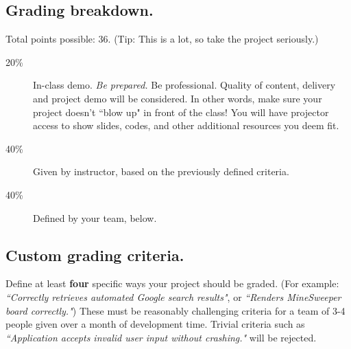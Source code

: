 \documentclass[12pt]{article}
\begin{document}
\subsection{Grading breakdown.}

Total points possible: 36. (Tip: This is a lot, so take the project seriously.)

\begin{description}
\item[20\%] In-class demo. {\it Be prepared.} Be professional. Quality of content, delivery and project demo will be considered. In other words, make sure your project doesn't ``blow up" in front of the class! You will have projector access to show slides, codes, and other additional resources you deem fit. 
\item[40\%] Given by instructor, based on the previously defined criteria.
\item[40\%] Defined by your team, below.
\end{description}

\subsection{Custom grading criteria.}

Define at least {\bf four} specific ways your project should be graded. (For example: {\it ``Correctly retrieves automated Google search results"}, or {\it ``Renders MineSweeper board correctly."}) These must be reasonably challenging criteria for a team of 3-4 people given over a month of development time. Trivial criteria such as {\it ``Application accepts invalid user input without crashing."} will be rejected.

\underline{\phantom{\hspace{5in}}}

\underline{\phantom{\hspace{5in}}}

\underline{\phantom{\hspace{5in}}}

\underline{\phantom{\hspace{5in}}}

\underline{\phantom{\hspace{5in}}}

\underline{\phantom{\hspace{5in}}}

\underline{\phantom{\hspace{5in}}}

\underline{\phantom{\hspace{5in}}}

\underline{\phantom{\hspace{5in}}}

\underline{\phantom{\hspace{5in}}}

\underline{\phantom{\hspace{5in}}}

\underline{\phantom{\hspace{5in}}}

\underline{\phantom{\hspace{5in}}}
\end{document}
